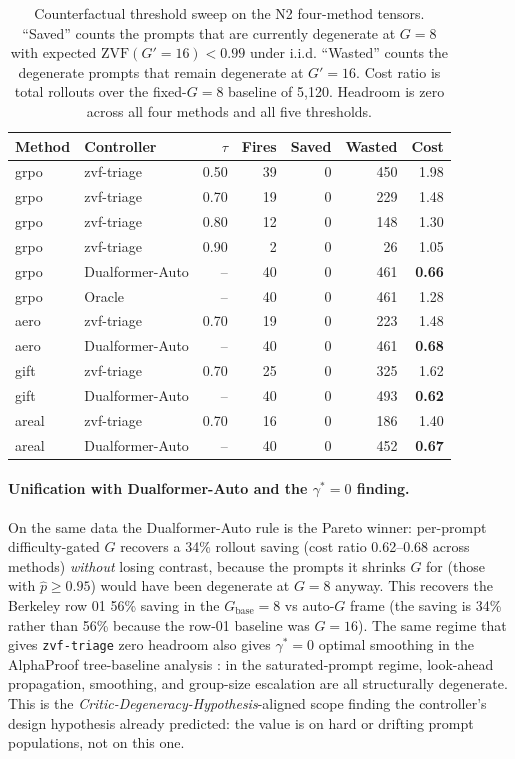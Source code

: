\begin{table}[t]
\centering
\caption{Counterfactual threshold sweep on the N2 four-method tensors.
``Saved'' counts the prompts that are currently degenerate at
$G{=}8$ with expected $\mathrm{ZVF}(G'{=}16)<0.99$ under i.i.d.
``Wasted'' counts the degenerate prompts that remain degenerate at
$G'{=}16$. Cost ratio is total rollouts over the fixed-$G{=}8$ baseline
of 5{,}120. Headroom is zero across all four methods and all five
thresholds.}
\label{tab:p7-cf-sweep}
\begin{tabular}{llrrrrr}
\toprule
Method & Controller & $\tau$ & Fires & Saved & Wasted & Cost \\
\midrule
grpo  & zvf-triage     & 0.50 & 39 & 0 & 450 & 1.98 \\
grpo  & zvf-triage     & 0.70 & 19 & 0 & 229 & 1.48 \\
grpo  & zvf-triage     & 0.80 & 12 & 0 & 148 & 1.30 \\
grpo  & zvf-triage     & 0.90 &  2 & 0 &  26 & 1.05 \\
grpo  & Dualformer-Auto &  -- & 40 & 0 & 461 & \textbf{0.66} \\
grpo  & Oracle         &  -- & 40 & 0 & 461 & 1.28 \\
\midrule
aero  & zvf-triage     & 0.70 & 19 & 0 & 223 & 1.48 \\
aero  & Dualformer-Auto &  -- & 40 & 0 & 461 & \textbf{0.68} \\
gift  & zvf-triage     & 0.70 & 25 & 0 & 325 & 1.62 \\
gift  & Dualformer-Auto &  -- & 40 & 0 & 493 & \textbf{0.62} \\
areal & zvf-triage     & 0.70 & 16 & 0 & 186 & 1.40 \\
areal & Dualformer-Auto &  -- & 40 & 0 & 452 & \textbf{0.67} \\
\bottomrule
\end{tabular}
\end{table}

\paragraph{Unification with Dualformer-Auto and the $\gamma^*{=}0$ finding.}
On the same data the Dualformer-Auto rule is the Pareto winner:
per-prompt difficulty-gated $G$ recovers a 34\% rollout saving
(cost ratio 0.62--0.68 across methods) \emph{without} losing contrast,
because the prompts it shrinks $G$ for (those with $\hat p \ge 0.95$)
would have been degenerate at $G{=}8$ anyway. This recovers the
Berkeley row 01 56\% saving \citep{su2024dualformer} in the
$G_{\text{base}}{=}8$ vs auto-$G$ frame (the saving is 34\% rather than
56\% because the row-01 baseline was $G{=}16$). The same regime that
gives \texttt{zvf-triage} zero headroom also gives
$\gamma^*{=}0$ optimal smoothing in the AlphaProof tree-baseline
analysis \citep{alphaproof2025nature}: in the saturated-prompt regime,
look-ahead propagation, smoothing, and group-size escalation are all
structurally degenerate. This is the \emph{Critic-Degeneracy-Hypothesis}-aligned
scope finding the controller's design hypothesis already predicted:
the value is on hard or drifting prompt populations, not on this one.

